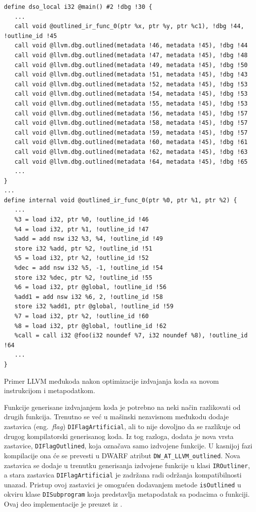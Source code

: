 \documentclass[12pt,oneside]{memoir}
\begin{document}
\begin{listing}
\begin{verbatim}
define dso_local i32 @main() #2 !dbg !30 {
   ...
   call void @outlined_ir_func_0(ptr %x, ptr %y, ptr %c1), !dbg !44, !outline_id !45
   call void @llvm.dbg.outlined(metadata !46, metadata !45), !dbg !44
   call void @llvm.dbg.outlined(metadata !47, metadata !45), !dbg !48
   call void @llvm.dbg.outlined(metadata !49, metadata !45), !dbg !50
   call void @llvm.dbg.outlined(metadata !51, metadata !45), !dbg !43
   call void @llvm.dbg.outlined(metadata !52, metadata !45), !dbg !53
   call void @llvm.dbg.outlined(metadata !54, metadata !45), !dbg !53
   call void @llvm.dbg.outlined(metadata !55, metadata !45), !dbg !53
   call void @llvm.dbg.outlined(metadata !56, metadata !45), !dbg !57
   call void @llvm.dbg.outlined(metadata !58, metadata !45), !dbg !57
   call void @llvm.dbg.outlined(metadata !59, metadata !45), !dbg !57
   call void @llvm.dbg.outlined(metadata !60, metadata !45), !dbg !61
   call void @llvm.dbg.outlined(metadata !62, metadata !45), !dbg !63
   call void @llvm.dbg.outlined(metadata !64, metadata !45), !dbg !65
   ...
}
...
define internal void @outlined_ir_func_0(ptr %0, ptr %1, ptr %2) {
   ...
   %3 = load i32, ptr %0, !outline_id !46
   %4 = load i32, ptr %1, !outline_id !47
   %add = add nsw i32 %3, %4, !outline_id !49
   store i32 %add, ptr %2, !outline_id !51
   %5 = load i32, ptr %2, !outline_id !52
   %dec = add nsw i32 %5, -1, !outline_id !54
   store i32 %dec, ptr %2, !outline_id !55
   %6 = load i32, ptr @global, !outline_id !56
   %add1 = add nsw i32 %6, 2, !outline_id !58
   store i32 %add1, ptr @global, !outline_id !59
   %7 = load i32, ptr %2, !outline_id !60
   %8 = load i32, ptr @global, !outline_id !62
   %call = call i32 @foo(i32 noundef %7, i32 noundef %8), !outline_id !64
   ...
}
\end{verbatim}
\caption{Primer LLVM međukoda nakon optimizacije izdvajanja koda sa novom instrukcijom i metapodatkom.}
\label{lst:outlining_ir_example}
\end{listing}

Funkcije generisane izdvajanjem koda je potrebno na neki način razlikovati od drugih funkcija.
Trenutno se već u mašinski nezavisnom međukodu dodaje zastavica (eng.~{\em flag}) \verb|DIFlagArtificial|, ali to nije dovoljno da se razlikuje od drugog kompilatorski generisanog koda.
Iz tog razloga, dodata je nova vrsta zastavice, \verb|DIFlagOutlined|, koja označava samo izdvojene funkcije.
U kasnijoj fazi kompilacije ona će se prevesti u DWARF atribut \verb|DW_AT_LLVM_outlined|.
Nova zastavica se dodaje u trenutku generisanja izdvojene funkcije u klasi \verb|IROutliner|, a stara zastavica \verb|DIFlagArtificial| je zadržana radi održanja kompatibilnosti unazad.
Pristup ovoj zastavici je omogućen dodavanjem metode \verb|isOutlined| u okviru klase \verb|DISubprogram| koja predstavlja metapodatak sa podacima o funkciji.
Ovaj deo implementacije je preuzet iz \cite{tomasevic2022autlajning}.
\end{document}
